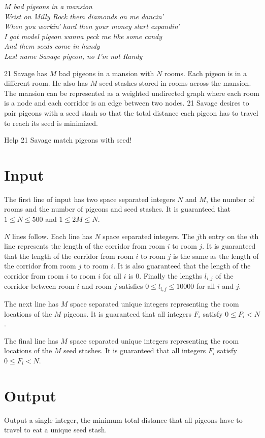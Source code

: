
\begin{center}
\textit{
$M$ bad pigeons in a mansion \\
Wrist on Milly Rock them diamonds on me dancin' \\
When you workin' hard then your money start expandin' \\
I got model pigeon wanna peck me like some candy \\
And them seeds come in handy \\
Last name Savage pigeon, no I'm not Randy \\
}
\end{center}

21 Savage has $M$ bad pigeons in a mansion with $N$ rooms. Each pigeon
is in a different room. He also has $M$ seed stashes stored in rooms across
the mansion. The mansion can be represented as a weighted undirected graph
where each room is a node and each corridor is an edge between two nodes. 21
Savage desires to pair pigeons with a seed stash so that the total distance
each pigeon has to travel to reach its seed is minimized.

\medskip

Help 21 Savage match pigeons with seed!

\section*{Input}

The first line of input has two space separated integers $N$ and $M$, the
number of rooms and the number of pigeons and seed stashes. It is guaranteed
that $1 \le N \le 500$ and $1 \le 2M \le N$.

$N$ lines follow. Each line has $N$ space separated integers. The $j$th entry
on the $i$th line represents the length of the corridor from room $i$ to room
$j$. It is guaranteed that the length of the corridor from room $i$ to room
$j$ is the same as the length of the corridor from room $j$ to room $i$. It
is also guaranteed that the length of the corridor from room $i$ to room $i$
for all $i$ is $0$. Finally the lengths $l_{i,j}$ of the corridor between room
$i$ and room $j$ satisfies $0 \le l_{i,j} \le 10000$ for all $i$ and $j$.

The next line has $M$ space separated unique integers representing the room
locations of the $M$ pigeons. It is guaranteed that all integers $F_i$ satisfy
$0 \le P_i < N$.

The final line has $M$ space separated unique integers representing the room
locations of the $M$ seed stashes. It is guaranteed that all integers $F_i$ satisfy
$0 \le F_i < N$.

\section*{Output}

Output a single integer, the minimum total distance that all pigeons have to
travel to eat a unique seed stash.
